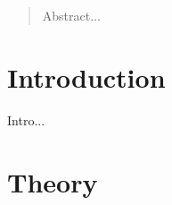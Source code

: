\documentclass[aps,twocolumn,pre,nofootinbib]{revtex4-1}
\begin{document}
\begin{abstract}

Abstract... 
  
\end{abstract}


\maketitle



\section{Introduction \label{sec:int}}

Intro...


 

\section{Theory \label{sec:the}}
\end{document}
